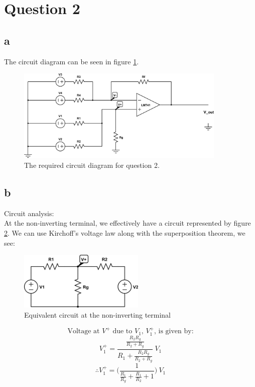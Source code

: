 \documentclass{article}
\theoremstyle{plain}
\theoremstyle{definition}
\theoremstyle{remark}
\begin{document}
\section*{Question 2}

\subsection*{a}
The circuit diagram can be seen in figure \ref{q2_a}.
\begin{figure}[h]
\begin{center}
\includegraphics[width=10cm]{q2_circuitDiagram.png}
\end{center}
\caption{The required circuit diagram for question 2.}
\label{q2_a}
\end{figure}


\subsection*{b}
Circuit analysis:\\

At the non-inverting terminal, we effectively have a circuit represented by figure \ref{q2_b1}. We can use Kirchoff's voltage law along with the superposition theorem, we see:
\begin{figure}[h]
\begin{center}
\includegraphics[width=6cm]{lab1_q2_kvl1.png}
\end{center}
\caption{Equivalent circuit at the non-inverting terminal}
\label{q2_b1}
\end{figure}

$$\text{Voltage at $V^+$ due to $V_1$, $V^+_1$, is given by:}$$
$$V^+_1 = \frac{\frac{R_2 R_g}{R_2+R_g}}{R_1 + \frac{R_2 R_g}{R_2+R_g}}\ V_1$$
$$\therefore V^+_1 = \Big(\frac{1}{\frac{R_1}{R_g} + \frac{R_1}{R_2} + 1}\Big) \ V_1$$
\end{document}
